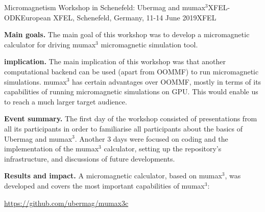 \begin{event}{ Micromagnetism Workshop in Schenefeld: Ubermag and mumax$^{3}$}{XFEL-ODK}{European XFEL, Schenefeld, Germany, 11-14 June 2019}{XFEL}{}{}{}

\textbf{Main goals.} The main goal of this workshop was to develop a
micromagnetic calculator for driving mumax$^{3}$ micromagnetic
simulation tool.

\textbf{\ODK implication.} The main implication of this workshop was
that another computational backend can be used (apart from OOMMF) to
run micromagnetic simulations. mumax$^{3}$ has certain advantages over
OOMMF, mostly in terms of its capabilities of running micromagnetic
simulations on GPU. This would enable us to reach a much larger target
audience.

\textbf{Event summary.} The first day of the workshop consisted of
presentations from all its participants in order to familiarise all
participants about the basics of Ubermag and mumax$^{3}$. Another 3
days were focused on coding and the implementation of the mumax$^{3}$
calculator, setting up the repository's infrastructure, and
discussions of future developments.

\textbf{Results and impact.} A micromagnetic calculator, based on
mumax$^{3}$, was developed and covers the most important capabilities
of mumax$^{3}$:

\centerline{\url{https://github.com/ubermag/mumax3c}}

\end{event}
